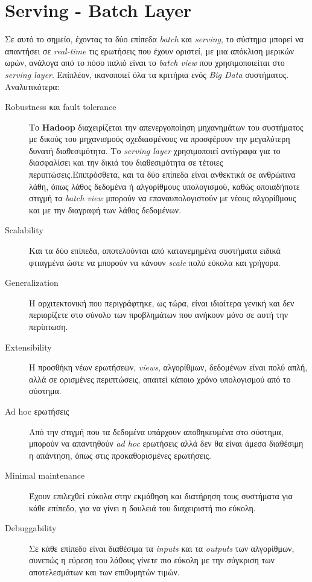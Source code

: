 \section{Serving - Batch Layer}
Σε αυτό το σημείο, έχοντας τα δύο επίπεδα \textit{batch} και \textit{serving}, το σύστημα μπορεί να απαντήσει σε \textit{real-time} τις ερωτήσεις που έχουν οριστεί, με μια απόκλιση μερικών ωρών, ανάλογα από το πόσο παλιό είναι το \textit{batch view} που χρησιμοποιείται στο \textit{serving layer}. Επίπλέον, ικανοποιεί όλα τα κριτήρια ενός \textit{Big Data} συστήματος. Αναλυτικότερα:
\begin{description}
\item[Robustness και fault tolerance] Το \textbf{Hadoop} διαχειρίζεται την απενεργοποίηση μηχανημάτων του συστήματος με δικούς του μηχανισμούς σχεδιασμένους να προσφέρουν την μεγαλύτερη δυνατή διαθεσιμότητα. Το \textit{serving layer} χρησιμοποιεί αντίγραφα για το διασφαλίσει και την δικιά του διαθεσιμότητα σε τέτοιες περιπτώσεις.Επιπρόσθετα, και τα δύο επίπεδα είναι ανθεκτικά σε ανθρώπινα λάθη, όπως λάθος δεδομένα ή αλγορίθμους υπολογισμού, καθώς οποιαδήποτε στιγμή τα \textit{batch view} μπορούν να επαναυπολογιστούν με νέους αλγορίθμους και με την διαγραφή των λάθος δεδομένων.
\item [Scalability] Και τα δύο επίπεδα, αποτελούνται από κατανεμημένα συστήματα ειδικά φτιαγμένα ώστε να μπορούν να κάνουν \textit{scale} πολύ εύκολα και γρήγορα.
\item[Generalization] Η αρχιτεκτονική που περιγράφτηκε, ως τώρα, είναι ιδιαίτερα γενική και δεν περιορίζετε στο σύνολο των προβλημάτων που ανήκουν μόνο σε αυτή την περίπτωση.
\item [Extensibility] Η προσθήκη νέων ερωτήσεων, \textit{views}, αλγορίθμων, δεδομένων είναι πολύ απλή, αλλά σε ορισμένες περιπτώσεις, απαιτεί κάποιο χρόνο υπολογισμού από το σύστημα.
\item [Ad hoc ερωτήσεις] Από την στιγμή που τα δεδομένα υπάρχουν αποθηκευμένα στο σύστημα, μπορούν να απαντηθούν \textit{ad hoc} ερωτήσεις αλλά δεν θα είναι άμεσα διαθέσιμη η απάντηση, όπως στις προκαθορισμένες ερωτήσεις.
\item [Minimal maintenance] Έχουν επιλεχθεί εύκολα στην εκμάθηση και διατήρηση τους συστήματα για κάθε επίπεδο, για να γίνει η δουλειά του διαχειριστή πιο εύκολη.
\item [Debuggability] Σε κάθε επίπεδο είναι διαθέσιμα τα \textit{inputs} και τα \textit{outputs} των αλγορίθμων, συνεπώς η εύρεση του λάθους γίνετε πιο εύκολη με την σύγκριση των αποτελεσμάτων και των επιθυμητών τιμών.
\end{description}

